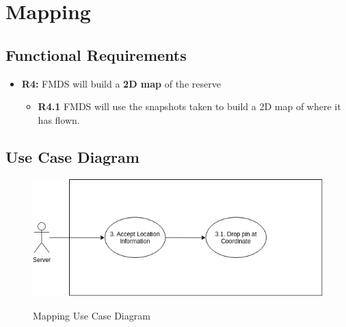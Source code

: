 \section{Mapping}

\subsection{Functional Requirements}

	\begin{flushleft}
		\begin{itemize}
			\item{\textbf{R4:}} FMDS will build a \textbf{2D map} of the reserve

				\begin{itemize}
					\item{\textbf{R4.1}} FMDS will use the snapshots taken to build a 2D map of where it has flown.
				\end{itemize}
		\end{itemize}
	\end{flushleft}

\subsection{Use Case Diagram}
	\begin{center}
		\begin{flushleft}
			\begin{figure}[h!]
				\centering
				\includegraphics[scale=0.45]{./assets/images/mapping-ucd.jpg}
				\label{fig: object-recognition-ucd }
				\caption{Mapping Use Case Diagram}
			\end{figure}

		\end{flushleft}
	\end{center}

